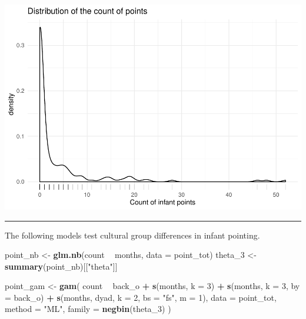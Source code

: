 \documentclass[]{article}
\newenvironment{Shaded}{\begin{snugshade}}{\end{snugshade}}
\newcommand{\DataTypeTok}[1]{\textcolor[rgb]{0.13,0.29,0.53}{#1}}
\newcommand{\DecValTok}[1]{\textcolor[rgb]{0.00,0.00,0.81}{#1}}
\newcommand{\KeywordTok}[1]{\textcolor[rgb]{0.13,0.29,0.53}{\textbf{#1}}}
\newcommand{\NormalTok}[1]{#1}
\newcommand{\OperatorTok}[1]{\textcolor[rgb]{0.81,0.36,0.00}{\textbf{#1}}}
\newcommand{\StringTok}[1]{\textcolor[rgb]{0.31,0.60,0.02}{#1}}
\begin{document}
\includegraphics{supplement_files/figure-latex/points-1.pdf}

\begin{center}\rule{0.5\linewidth}{\linethickness}\end{center}

The following models test cultural group differences in infant pointing.

\begin{Shaded}
\begin{Highlighting}[]
\NormalTok{point_nb <-}\StringTok{ }\KeywordTok{glm.nb}\NormalTok{(count }\OperatorTok{~}\StringTok{ }\NormalTok{months, }\DataTypeTok{data =}\NormalTok{ point_tot)}
\NormalTok{theta_}\DecValTok{3}\NormalTok{ <-}\StringTok{ }\KeywordTok{summary}\NormalTok{(point_nb)[[}\StringTok{"theta"}\NormalTok{]]}

\NormalTok{point_gam <-}\StringTok{ }\KeywordTok{gam}\NormalTok{(}
\NormalTok{  count }\OperatorTok{~}
\StringTok{    }\NormalTok{back_o }\OperatorTok{+}
\StringTok{    }\KeywordTok{s}\NormalTok{(months, }\DataTypeTok{k =} \DecValTok{3}\NormalTok{) }\OperatorTok{+}
\StringTok{    }\KeywordTok{s}\NormalTok{(months, }\DataTypeTok{k =} \DecValTok{3}\NormalTok{, }\DataTypeTok{by =}\NormalTok{ back_o) }\OperatorTok{+}
\StringTok{    }\KeywordTok{s}\NormalTok{(months, dyad, }\DataTypeTok{k =} \DecValTok{2}\NormalTok{, }\DataTypeTok{bs =} \StringTok{"fs"}\NormalTok{, }\DataTypeTok{m =} \DecValTok{1}\NormalTok{),}
  \DataTypeTok{data =}\NormalTok{ point_tot,}
  \DataTypeTok{method =} \StringTok{"ML"}\NormalTok{,}
  \DataTypeTok{family =} \KeywordTok{negbin}\NormalTok{(theta_}\DecValTok{3}\NormalTok{)}
\NormalTok{)}
\end{Highlighting}
\end{Shaded}
\end{document}
